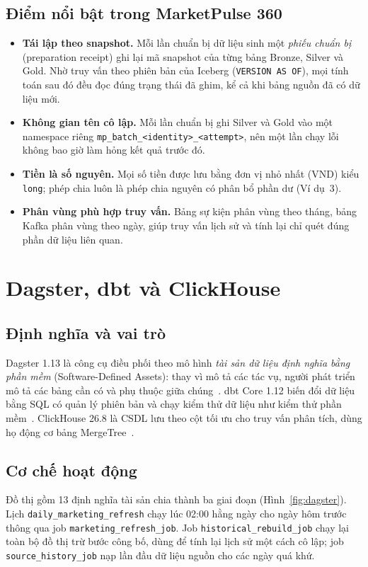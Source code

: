 \subsection{Điểm nổi bật trong MarketPulse 360}
\label{sec:c3-lakehouse-hien-thuc}
\begin{itemize}
    \item \textbf{Tái lập theo snapshot.} Mỗi lần chuẩn bị dữ liệu sinh một \emph{phiếu chuẩn bị} (preparation receipt) ghi lại mã snapshot của từng bảng Bronze, Silver và Gold. Nhờ truy vấn theo phiên bản của Iceberg (\texttt{VERSION AS OF}), mọi tính toán sau đó đều đọc đúng trạng thái đã ghim, kể cả khi bảng nguồn đã có dữ liệu mới.
    \item \textbf{Không gian tên cô lập.} Mỗi lần chuẩn bị ghi Silver và Gold vào một namespace riêng \texttt{mp\_batch\_<identity>\_<attempt>}, nên một lần chạy lỗi không bao giờ làm hỏng kết quả trước đó.
    \item \textbf{Tiền là số nguyên.} Mọi số tiền được lưu bằng đơn vị nhỏ nhất (VND) kiểu \texttt{long}; phép chia luôn là phép chia nguyên có phân bổ phần dư (Ví dụ~3).
    \item \textbf{Phân vùng phù hợp truy vấn.} Bảng sự kiện phân vùng theo tháng, bảng Kafka phân vùng theo ngày, giúp truy vấn lịch sử và tính lại chỉ quét đúng phần dữ liệu liên quan.
\end{itemize}

\section{Dagster, dbt và ClickHouse}
\label{sec:c3-dagster-dbt-clickhouse}

\subsection{Định nghĩa và vai trò}
\label{sec:c3-dagster-dinh-nghia}
Dagster 1.13 là công cụ điều phối theo mô hình \emph{tài sản dữ liệu định nghĩa bằng phần mềm} (Software-Defined Assets): thay vì mô tả các tác vụ, người phát triển mô tả các bảng cần có và phụ thuộc giữa chúng~\cite{dagsterdocs}. dbt Core 1.12 biến đổi dữ liệu bằng SQL có quản lý phiên bản và chạy kiểm thử dữ liệu như kiểm thử phần mềm~\cite{dbtdocs}. ClickHouse 26.8 là CSDL lưu theo cột tối ưu cho truy vấn phân tích, dùng họ động cơ bảng MergeTree~\cite{clickhousedocs}.

\subsection{Cơ chế hoạt động}
\label{sec:c3-dagster-co-che}
Đồ thị gồm 13 định nghĩa tài sản chia thành ba giai đoạn (Hình~\ref{fig:dagster}). Lịch \texttt{daily\_marketing\_refresh} chạy lúc 02:00 hằng ngày cho ngày hôm trước thông qua job \texttt{marketing\_refresh\_job}. Job \texttt{historical\_rebuild\_job} chạy lại toàn bộ đồ thị trừ bước công bố, dùng để tính lại lịch sử một cách cô lập; job \texttt{source\_history\_job} nạp lần đầu dữ liệu nguồn cho các ngày quá khứ.

